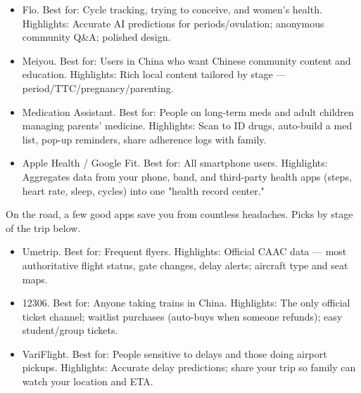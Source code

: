 
\begin{itemize}
  \item Flo. Best for: Cycle tracking, trying to conceive, and women's health. Highlights: Accurate AI predictions for periods/ovulation; anonymous community Q\&A; polished design.
  \item Meiyou. Best for: Users in China who want Chinese community content and education. Highlights: Rich local content tailored by stage — period/TTC/pregnancy/parenting.
\end{itemize}


\begin{itemize}
  \item Medication Assistant. Best for: People on long-term meds and adult children managing parents' medicine. Highlights: Scan to ID drugs, auto-build a med list, pop-up reminders, share adherence logs with family.
\end{itemize}


\begin{itemize}
  \item Apple Health / Google Fit. Best for: All smartphone users. Highlights: Aggregates data from your phone, band, and third-party health apps (steps, heart rate, sleep, cycles) into one "health record center."
\end{itemize}


On the road, a few good apps save you from countless headaches. Picks by stage of the trip below.


\begin{itemize}
  \item Umetrip. Best for: Frequent flyers. Highlights: Official CAAC data — most authoritative flight status, gate changes, delay alerts; aircraft type and seat maps.
  \item 12306. Best for: Anyone taking trains in China. Highlights: The only official ticket channel; waitlist purchases (auto-buys when someone refunds); easy student/group tickets.
  \item VariFlight. Best for: People sensitive to delays and those doing airport pickups. Highlights: Accurate delay predictions; share your trip so family can watch your location and ETA.
\end{itemize}

